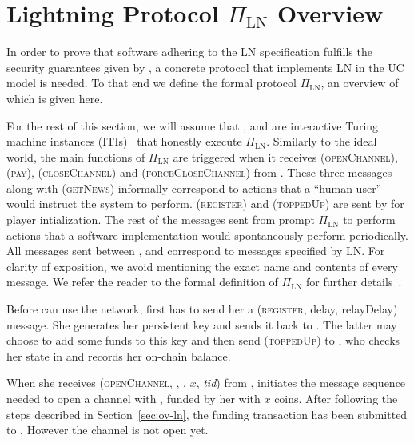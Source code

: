 \section{Lightning Protocol $\Pi_{\mathrm{LN}}$ Overview}
\label{sec:ov-protocol}

  In order to prove that software adhering to the LN specification
  fulfills the security guarantees given by \fpaynet, a concrete
  protocol that implements LN in the UC model is needed. To that end we
  define the formal protocol $\Pi_{\mathrm{LN}}$, an overview of which is given
  here.

  For the rest of this section, we will assume that \alice, \bob{} and
  \charlie{} are interactive Turing machine instances (ITIs)~\cite{uc}
  that honestly execute $\Pi_{\mathrm{LN}}$. Similarly to the ideal world, the
  main functions of $\Pi_{\mathrm{LN}}$ are triggered when it receives
  (\textsc{openChannel}), (\textsc{pay}), (\textsc{closeChannel}) and
  (\textsc{forceCloseChannel}) from \environment{}. These three messages along
  with (\textsc{getNews}) informally correspond to actions that a ``human user''
  would instruct the system to perform. (\textsc{register}) and
  (\textsc{toppedUp}) are sent by \environment{} for player intialization. The
  rest of the messages sent from \environment{} prompt $\Pi_{\mathrm{LN}}$ to
  perform actions that a software implementation would spontaneously perform
  periodically. All messages sent between \alice, \bob{} and \charlie{}
  correspond to messages specified by LN. For clarity of exposition, we avoid
  mentioning the exact name and contents of every message. We refer the reader
  to the formal definition of $\Pi_{\mathrm{LN}}$ for further
  details~.

    Before \alice{} can use the network, \environment{} first has to send her a
    (\textsc{register}, delay, relayDelay) message. She generates her
    persistent key and sends it back to \environment{}. The latter may choose to
    add some funds to this key and then send (\textsc{toppedUp}) to \alice, who
    checks her state in \ledger{} and records her on-chain balance.

    When she receives (\textsc{openChannel}, \alice, \bob, $x$, \textit{tid})
    from \environment, \alice{} initiates the message sequence needed to open a
    channel with \bob, funded by her with $x$ coins. After following the
    steps described in Section~\ref{sec:ov-ln}, the funding transaction has been
    submitted to \ledger. However the channel is not open yet.

